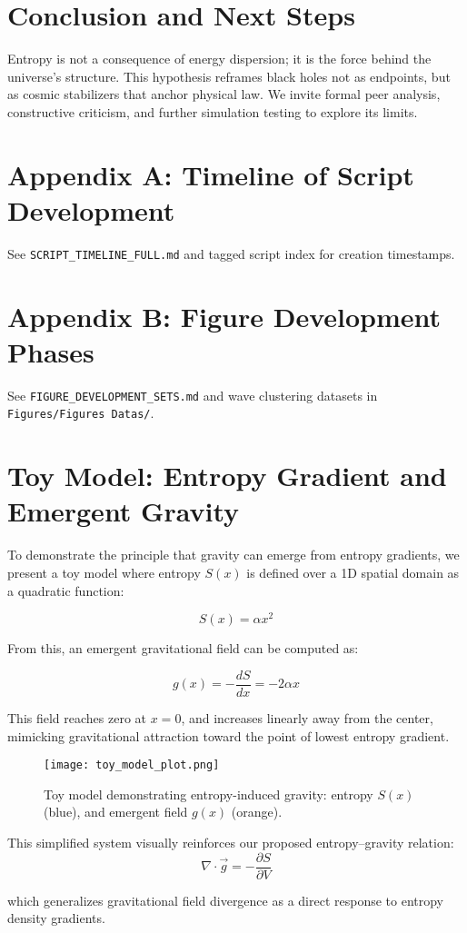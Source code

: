 \documentclass[12pt]{article}
\begin{document}
\section{Conclusion and Next Steps}
Entropy is not a consequence of energy dispersion; it is the force behind the universe's structure. This hypothesis reframes black holes not as endpoints, but as cosmic stabilizers that anchor physical law. We invite formal peer analysis, constructive criticism, and further simulation testing to explore its limits.

\appendix

\section{Appendix A: Timeline of Script Development}
See \texttt{SCRIPT\_TIMELINE\_FULL.md} and tagged script index for creation timestamps.

\section{Appendix B: Figure Development Phases}
See \texttt{FIGURE\_DEVELOPMENT\_SETS.md} and wave clustering datasets in \texttt{Figures/Figures Datas/}.


\section{Toy Model: Entropy Gradient and Emergent Gravity}

To demonstrate the principle that gravity can emerge from entropy gradients, we present a toy model where entropy \( S(x) \) is defined over a 1D spatial domain as a quadratic function:

\[
S(x) = \alpha x^2
\]

From this, an emergent gravitational field can be computed as:

\[
g(x) = -\frac{dS}{dx} = -2\alpha x
\]

This field reaches zero at \( x = 0 \), and increases linearly away from the center, mimicking gravitational attraction toward the point of lowest entropy gradient.

\begin{figure}[h]
    \centering
    \texttt{[image: toy\_model\_plot.png]}
    \caption{Toy model demonstrating entropy-induced gravity: entropy \( S(x) \) (blue), and emergent field \( g(x) \) (orange).}
\end{figure}

This simplified system visually reinforces our proposed entropy–gravity relation:
\[
\nabla \cdot \vec{g} = -\frac{\partial S}{\partial V}
\]

which generalizes gravitational field divergence as a direct response to entropy density gradients.
\end{document}

